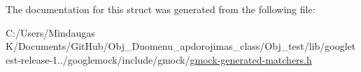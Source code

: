 The documentation for this struct was generated from the following file\+:\begin{DoxyCompactItemize}
\item 
C\+:/\+Users/\+Mindaugas K/\+Documents/\+Git\+Hub/\+Obj\+\_\+\+Duomenu\+\_\+apdorojimas\+\_\+class/\+Obj\+\_\+test/lib/googletest-\/release-\/1../googlemock/include/gmock/\mbox{\hyperlink{_obj__test_2lib_2googletest-release-1_88_81_2googlemock_2include_2gmock_2gmock-generated-matchers_8h}{gmock-\/generated-\/matchers.\+h}}\end{DoxyCompactItemize}
